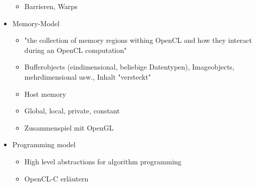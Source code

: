 \begin{itemize}
\begin{itemize}
            \item Barrieren, Warps
    \end{itemize}
\item Memory-Model
    \begin{itemize}
            \item "the collection of memory regions withing OpenCL and how they interact during an OpenCL computation"
            \item Bufferobjects (eindimensional, beliebige Datentypen), Imageobjects, mehrdimensional usw., Inhalt "versteckt"
            \item Host memory
            \item Global, local, private, constant
            \item Zusammenspiel mit OpenGL
    \end{itemize}
\item Programming model
\begin{itemize}
    \item High level abstractions for algorithm programming
    \item OpenCL-C erläutern
\end{itemize}
\end{itemize}

